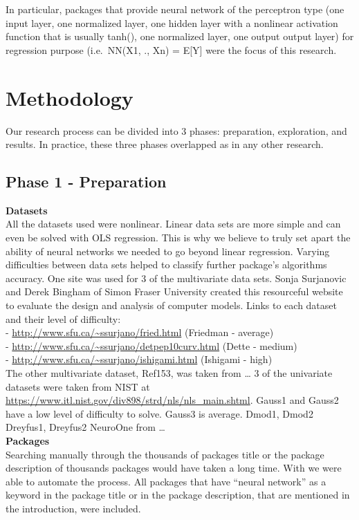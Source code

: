 In particular, packages that provide neural network of the perceptron
type (one input layer, one normalized layer, one hidden layer with a
nonlinear activation function that is usually tanh(), one normalized
layer, one output output layer) for regression purpose (i.e.~NN(X1, .,
Xn) = E{[}Y{]} were the focus of this research.

\hypertarget{methodology}{%
\section{Methodology}\label{methodology}}

Our research process can be divided into 3 phases: preparation,
exploration, and results. In practice, these three phases overlapped as
in any other research.

\hypertarget{phase-1---preparation}{%
\subsection{Phase 1 - Preparation}\label{phase-1---preparation}}

\textbf{Datasets}\\
All the datasets used were nonlinear. Linear data sets are more simple
and can even be solved with OLS regression. This is why we believe to
truly set apart the ability of neural networks we needed to go beyond
linear regression. Varying difficulties between data sets helped to
classify further package's algorithms accuracy. One site was used for 3
of the multivariate data sets. Sonja Surjanovic and Derek Bingham of
Simon Fraser University created this resourceful website to evaluate the
design and analysis of computer models. Links to each dataset and their
level of difficulty:\\
- \url{http://www.sfu.ca/~ssurjano/fried.html} (Friedman - average)\\
- \url{http://www.sfu.ca/~ssurjano/detpep10curv.html} (Dette - medium)\\
- \url{http://www.sfu.ca/~ssurjano/ishigami.html} (Ishigami - high)\\
The other multivariate dataset, Ref153, was taken from \ldots{} 3 of the
univariate datasets were taken from NIST at
\url{https://www.itl.nist.gov/div898/strd/nls/nls_main.shtml}. Gauss1
and Gauss2 have a low level of difficulty to solve. Gauss3 is average.
Dmod1, Dmod2 Dreyfus1, Dreyfus2 NeuroOne from \ldots{}\\
\textbf{Packages}\\
Searching manually through the thousands of packages title or the
package description of thousands packages would have taken a long time.
With  \citep{R-RWsearch} we were able to automate the
process. All packages that have ``neural network'' as a keyword in the
package title or in the package description, that are mentioned in the
introduction, were included.

